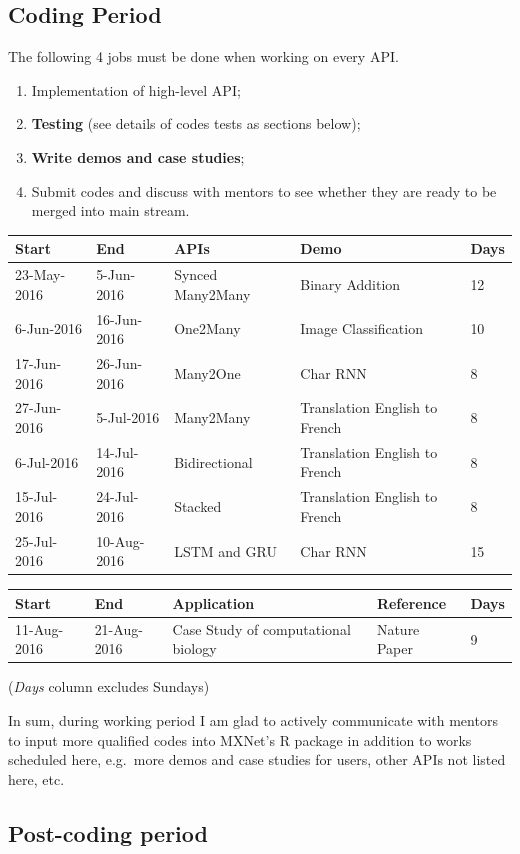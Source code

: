 \documentclass[]{article}
\providecommand{\tightlist}{%
  \setlength{\itemsep}{0pt}\setlength{\parskip}{0pt}}
\begin{document}
\subsection{Coding Period}\label{coding-period}

The following 4 jobs must be done when working on every API.

\begin{enumerate}
\def\labelenumi{\arabic{enumi}.}
\tightlist
\item
  Implementation of high-level API;
\item
  \textbf{Testing} (see details of codes tests as sections below);
\item
  \textbf{Write demos and case studies};
\item
  Submit codes and discuss with mentors to see whether they are ready to
  be merged into main stream.
\end{enumerate}

\begin{longtable}[c]{@{}lllll@{}}
\toprule
Start & End & APIs & Demo & Days\tabularnewline
\midrule
\endhead
23-May-2016 & 5-Jun-2016 & Synced Many2Many & Binary Addition &
12\tabularnewline
6-Jun-2016 & 16-Jun-2016 & One2Many & Image Classification &
10\tabularnewline
17-Jun-2016 & 26-Jun-2016 & Many2One & Char RNN & 8\tabularnewline
27-Jun-2016 & 5-Jul-2016 & Many2Many & Translation English to French &
8\tabularnewline
6-Jul-2016 & 14-Jul-2016 & Bidirectional & Translation English to French
& 8\tabularnewline
15-Jul-2016 & 24-Jul-2016 & Stacked & Translation English to French &
8\tabularnewline
25-Jul-2016 & 10-Aug-2016 & LSTM and GRU & Char RNN & 15\tabularnewline
\bottomrule
\end{longtable}

\begin{longtable}[c]{@{}lllll@{}}
\toprule
Start & End & Application & Reference & Days\tabularnewline
\midrule
\endhead
11-Aug-2016 & 21-Aug-2016 & Case Study of computational biology & Nature
Paper & 9\tabularnewline
\bottomrule
\end{longtable}

(\emph{Days} column excludes Sundays)

In sum, during working period I am glad to actively communicate with
mentors to input more qualified codes into MXNet's R package in addition
to works scheduled here, e.g.~more demos and case studies for users,
other APIs not listed here, etc.

\subsection{Post-coding period}\label{post-coding-period}
\end{document}
